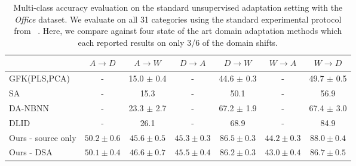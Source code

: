 \begin{table*}
  \setlength{\tabcolsep}{4pt}
  \small
\centering
\begin{tabular}{lcccccc}
\toprule
                     & $A \rightarrow D$   & $A \rightarrow W$   & $D \rightarrow A$   & $D \rightarrow W$   & $W \rightarrow A$   & $W \rightarrow D$   \\
\midrule
GFK(PLS,PCA)~\cite{gong-cvpr12} & - & 15.0 $\pm$ 0.4 & - & 44.6 $\pm$ 0.3 & - & 49.7 $\pm$ 0.5\\
SA~\cite{fernando-iccv13} & - & 15.3 & - & 50.1& - & 56.9\\
DA-NBNN~\cite{da-nbnn} & - & 23.3 $\pm$ 2.7 & - & 67.2 $\pm$ 1.9 & - & 67.4 $\pm$ 3.0\\
DLID~\cite{ref:dlid} & - & 26.1 & - & 68.9 & - & 84.9\\
\midrule
 Ours - source only   & $\bm{50.2 \pm 0.6}$     & $45.6 \pm 0.5$     & $45.3 \pm 0.3$     & $\bm{86.5 \pm 0.3}$     & $\bm{44.2 \pm 0.3}$     & $\bm{88.0 \pm 0.4}$     \\
Ours  - DSA  & $50.1 \pm 0.4$     & $\bm{46.6 \pm 0.7}$     & $\bm{45.5 \pm 0.4}$     & $86.2 \pm 0.3$     & $43.0 \pm 0.4$     & $86.7 \pm 0.5$     \\
\bottomrule
\end{tabular}

\caption{Multi-class accuracy evaluation on the standard unsupervised adaptation setting with the \emph{Office} dataset. We evaluate on all 31 categories using the standard experimental protocol from ~\cite{gong-cvpr12}. Here, we compare against four state of the art domain adaptation methods which each reported results on only 3/6 of the domain shifts.}
\label{table:full-unsuper}
\end{table*}

